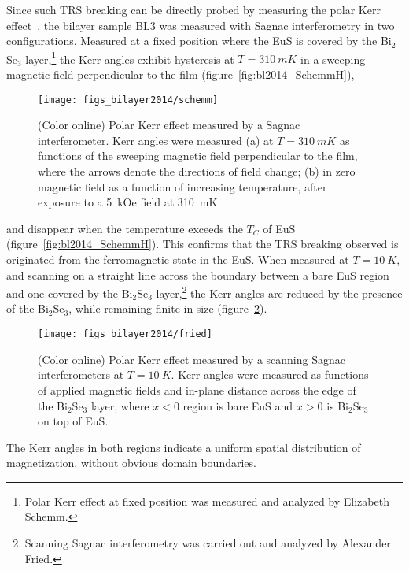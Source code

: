 Since such TRS breaking can be directly probed by measuring the polar Kerr effect~\cite{Xia2006}, the bilayer sample BL3 was measured with Sagnac interferometry in two configurations. Measured at a fixed position where the EuS is covered by the Bi$_2$Se$_3$ layer,\footnote{Polar Kerr effect at fixed position was measured and analyzed by Elizabeth Schemm.} the Kerr angles exhibit hysteresis at $T=\SI{310}{mK}$ in a sweeping magnetic field perpendicular to the film (figure~\ref{fig:bl2014_SchemmH}),%
%
\begin{figure}[ht]%
\centering%
\subfloat{\label{fig:bl2014_SchemmT}}%
\subfloat{\label{fig:bl2014_SchemmH}}%
\texttt{[image: figs\_bilayer2014/schemm]}
\caption[Polar Kerr effect in a Bi$_2$Se$_3$--EuS bilayer]{\label{fig:bl2014_schemm}(Color online) Polar Kerr effect measured by a Sagnac interferometer. Kerr angles were measured (a) at $T=\SI{310}{mK}$ as functions of the sweeping magnetic field perpendicular to the film, where the arrows denote the directions of field change; (b) in zero magnetic field as a function of increasing temperature, after exposure to a 5~kOe field at \SI{310}{mK}.}%
\end{figure} %
%
and disappear when the temperature exceeds the $T_C$ of EuS (figure~\ref{fig:bl2014_SchemmH}). This confirms that the TRS breaking observed is originated from the ferromagnetic state in the EuS. When measured at $T=\SI{10}{K}$, and scanning on a straight line across the boundary between a bare EuS region and one covered by the Bi$_2$Se$_3$ layer,\footnote{Scanning Sagnac interferometry was carried out and analyzed by Alexander Fried.} the Kerr angles are reduced by the presence of the Bi$_2$Se$_3$, while remaining finite in size (figure~\ref{fig:bl2014_Fried}).%
%
\begin{figure}[ht]%
\centering%
\texttt{[image: figs\_bilayer2014/fried]}
\caption[Spatial distribution of the Kerr angles in a Bi$_2$Se$_3$--EuS bilayer]{\label{fig:bl2014_Fried}(Color online) Polar Kerr effect measured by a scanning Sagnac interferometers at $T=\SI{10}{K}$. Kerr angles were measured as functions of applied magnetic fields and in-plane distance across the edge of the Bi$_2$Se$_3$ layer, where $x<0$ region is bare EuS and $x>0$ is Bi$_2$Se$_3$ on top of EuS.}%
\end{figure} %
The Kerr angles in both regions indicate a uniform spatial distribution of magnetization, without obvious domain boundaries.

\FloatBarrier%
